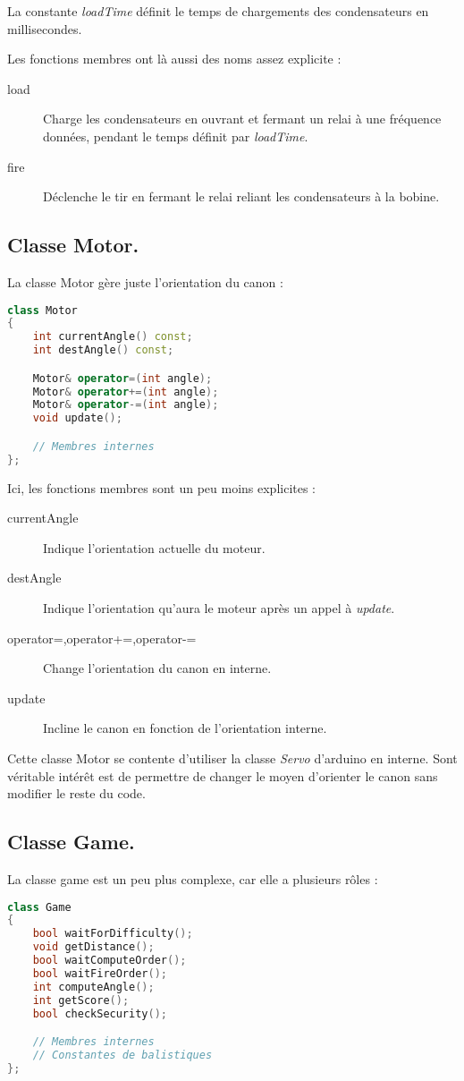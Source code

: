 La constante \emph{loadTime} définit le temps de chargements des condensateurs en millisecondes.

Les fonctions membres ont là aussi des noms assez explicite :\begin{description}
	\item[load] Charge les condensateurs en ouvrant et fermant un relai à une fréquence données, pendant le temps définit par \emph{loadTime}.
	\item[fire] Déclenche le tir en fermant le relai reliant les condensateurs à la bobine.
\end{description}

\subsection{Classe Motor.} \label{ard_mot}
La classe Motor gère juste l'orientation du canon :
\begin{lstlisting}[language=C++]
class Motor
{
	int currentAngle() const;
	int destAngle() const;

	Motor& operator=(int angle);
	Motor& operator+=(int angle);
	Motor& operator-=(int angle);
	void update();

	// Membres internes
};
\end{lstlisting}

Ici, les fonctions membres sont un peu moins explicites :\begin{description}
	\item[currentAngle] Indique l'orientation actuelle du moteur.
	\item[destAngle] Indique l'orientation qu'aura le moteur après un appel à \emph{update}.
	\item[operator=,operator+=,operator-=] Change l'orientation du canon en interne.
	\item[update] Incline le canon en fonction de l'orientation interne.
\end{description}

Cette classe Motor se contente d'utiliser la classe \emph{Servo} d'arduino en interne. Sont véritable intérêt est de permettre de changer le moyen d'orienter le canon sans modifier le reste du code.

\subsection{Classe Game.} \label{ard_game}
La classe game est un peu plus complexe, car elle a plusieurs rôles :
\begin{lstlisting}[language=C++]
class Game
{
	bool waitForDifficulty();
	void getDistance();
	bool waitComputeOrder();
	bool waitFireOrder();
	int computeAngle();
	int getScore();
	bool checkSecurity();

	// Membres internes
	// Constantes de balistiques
};
\end{lstlisting}

